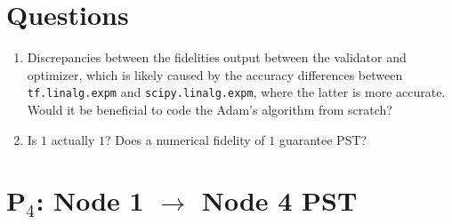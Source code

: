 \documentclass[aps]{revtex4-2}
\begin{document}
\section{Questions}
\begin{enumerate}
    \item Discrepancies between the fidelities output between the validator and optimizer, which is likely caused by the accuracy differences between \texttt{tf.linalg.expm} and \texttt{scipy.linalg.expm}, where the latter is more accurate. Would it be beneficial to code the Adam's algorithm from scratch?
    \item Is $1$ actually $1$? Does a numerical fidelity of $1$ guarantee PST?
\end{enumerate}
\newpage
\section{P$_4$: Node 1 $\rightarrow$ Node 4 PST}
\end{document}
